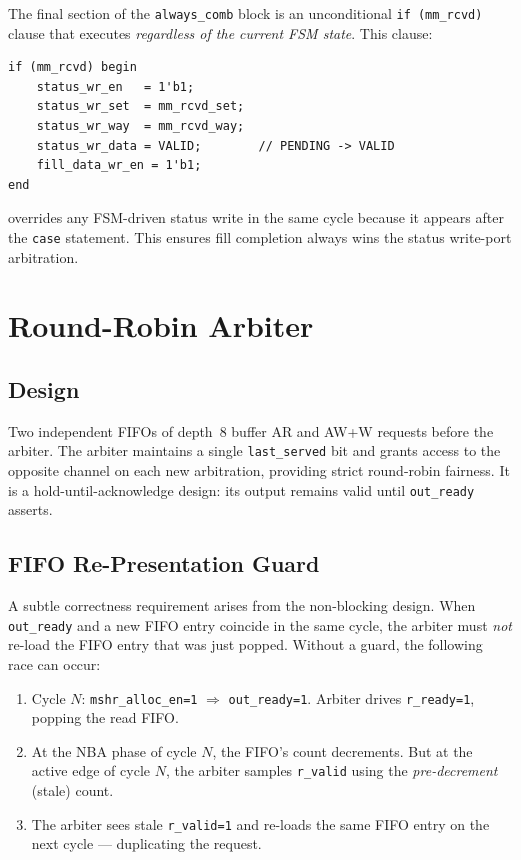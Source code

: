 \documentclass[12pt,letterpaper]{report}
\begin{document}
The final section of the \texttt{always\_comb} block is an
unconditional \texttt{if (mm\_rcvd)} clause that executes
\emph{regardless of the current FSM state}.  This clause:

\begin{lstlisting}[style=sv]
if (mm_rcvd) begin
    status_wr_en   = 1'b1;
    status_wr_set  = mm_rcvd_set;
    status_wr_way  = mm_rcvd_way;
    status_wr_data = VALID;        // PENDING -> VALID
    fill_data_wr_en = 1'b1;
end
\end{lstlisting}

\noindent overrides any FSM-driven status write in the same cycle
because it appears after the \texttt{case} statement.  This ensures
fill completion always wins the status write-port arbitration.

\section{Round-Robin Arbiter}
\label{sec:arbiter}

\subsection{Design}

Two independent FIFOs of depth~8 buffer AR and AW+W requests before
the arbiter.  The arbiter maintains a single \texttt{last\_served} bit
and grants access to the opposite channel on each new arbitration,
providing strict round-robin fairness.  It is a hold-until-acknowledge
design: its output remains valid until \texttt{out\_ready} asserts.

\subsection{FIFO Re-Presentation Guard}

A subtle correctness requirement arises from the non-blocking design.
When \texttt{out\_ready} and a new FIFO entry coincide in the same
cycle, the arbiter must \emph{not} re-load the FIFO entry that was
just popped.  Without a guard, the following race can occur:

\begin{enumerate}[label=\arabic*.]
  \item Cycle $N$: \texttt{mshr\_alloc\_en=1} $\Rightarrow$
        \texttt{out\_ready=1}.  Arbiter drives \texttt{r\_ready=1},
        popping the read FIFO.
  \item At the NBA phase of cycle $N$, the FIFO's count decrements.
        But at the active edge of cycle $N$, the arbiter samples
        \texttt{r\_valid} using the \emph{pre-decrement} (stale) count.
  \item The arbiter sees stale \texttt{r\_valid=1} and re-loads the
        same FIFO entry on the next cycle --- duplicating the request.
\end{enumerate}
\end{document}
